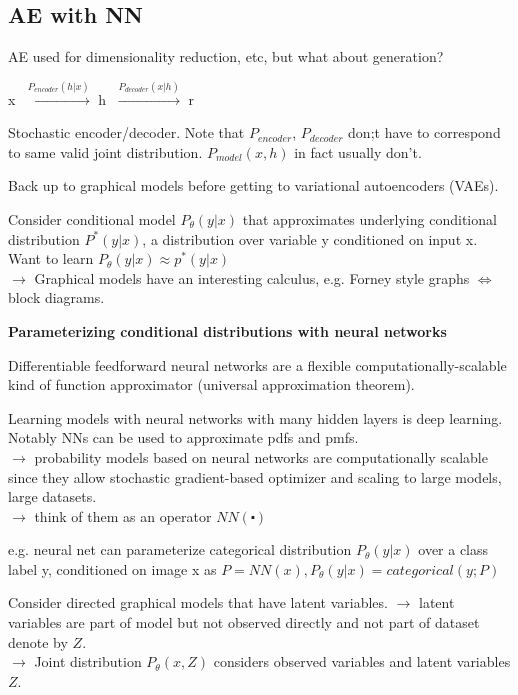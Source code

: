 \documentclass[12pt,a4paper]{article}
\begin{document}
\vspace{0.5cm}
\subsection{AE with NN}
AE used for dimensionality reduction, etc, but what about generation?

\textcircled{x} $\overset{P_{encoder}(h|x)}{\longrightarrow}$ \textcircled{h} $\overset{P_{decoder}(x|h)} {\longrightarrow}$ \textcircled{r}

Stochastic encoder/decoder. Note that $P_{encoder}$, $P_{decoder}$ don;t have to correspond to same valid joint distribution. $P_{model}(x,h)$ in fact usually don't. 

\vspace{0.5cm}
Back up to graphical models before getting to variational autoencoders (VAEs).

Consider conditional model $P_\theta(y|x)$ that approximates underlying conditional distribution $P^*(y|x)$, a distribution over variable y conditioned on input x. \\
Want to learn $P_\theta(y|x)\approx p^*(y|x)$\\
$\rightarrow$ Graphical models have an interesting calculus, e.g. Forney style graphs $\Leftrightarrow$ block diagrams. 

\textbf{Parameterizing conditional distributions with neural networks}

Differentiable feedforward neural networks are a flexible computationally-scalable kind of function approximator (universal approximation theorem). 

Learning models with neural networks with many hidden layers is deep learning. 
Notably NNs can be used to approximate pdfs and pmfs. \\
$\rightarrow$ probability models based on neural networks are computationally scalable since they allow stochastic gradient-based optimizer and scaling to large models, large datasets. \\ 
$\rightarrow$ think of them as an operator $NN(\centerdot)$

e.g. neural net can parameterize categorical distribution $P_\theta(y|x)$ over a class label y, conditioned on image x as $P=NN(x),P_\theta(y|x)=categorical(y;P)$

\vspace{0.5cm}
Consider directed graphical models that have latent variables.
$\rightarrow$ latent variables are part of model but not observed directly and not part of dataset denote by $Z$. \\
$\rightarrow$ Joint distribution $P_\theta(x,Z)$ considers observed variables and latent variables $Z$. 
\end{document}
